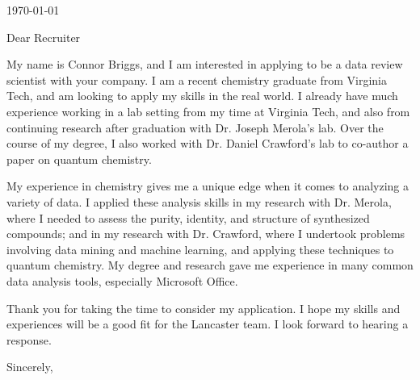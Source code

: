 \documentclass[12pt]{letter}
\begin{document}
\begin{letter}{\today}

  \opening{Dear Recruiter}

   My name is Connor Briggs, and I am interested in applying to be a data review scientist with your company. I am a recent chemistry graduate from Virginia Tech, and am looking to apply my skills in the real world. I already have much experience working in a lab setting from my time at Virginia Tech, and also from continuing research after graduation with Dr. Joseph Merola's lab. Over the course of my degree, I also worked with Dr. Daniel Crawford's lab to co-author a paper on quantum chemistry.
  
  
  My experience in chemistry gives me a unique edge when it comes to analyzing a variety of data. I applied these analysis skills in my research with Dr. Merola, where I needed to assess the purity, identity, and structure of synthesized compounds; and in my research with Dr. Crawford, where I undertook problems involving data mining and machine learning, and applying these techniques to quantum chemistry. My degree and research gave me experience in many common data analysis tools, especially Microsoft Office.


  Thank you for taking the time to consider my application. I hope my skills and experiences will be a good fit for the Lancaster team. I look forward to hearing a response.
  
\closing{Sincerely,}
  
\end{letter}
\end{document}
